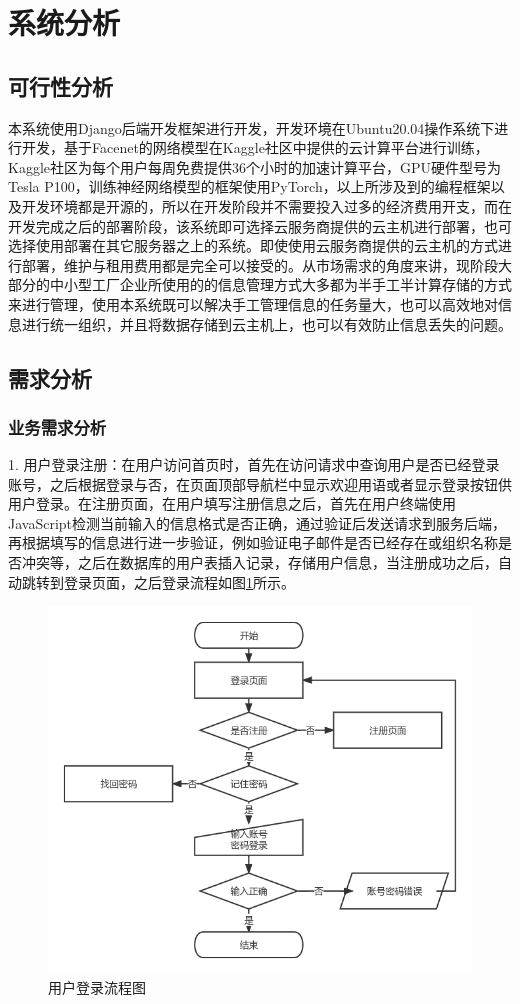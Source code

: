 \section{系统分析}

\subsection{可行性分析}

本系统使用Django后端开发框架进行开发，开发环境在Ubuntu20.04操作系统下进行开发，基于Facenet的网络模型在Kaggle社区中提供的云计算平台进行训练，Kaggle社区为每个用户每周免费提供36个小时的加速计算平台，GPU硬件型号为Tesla P100，训练神经网络模型的框架使用PyTorch，以上所涉及到的编程框架以及开发环境都是开源的，所以在开发阶段并不需要投入过多的经济费用开支，而在开发完成之后的部署阶段，该系统即可选择云服务商提供的云主机进行部署，也可选择使用部署在其它服务器之上的系统。即使使用云服务商提供的云主机的方式进行部署，维护与租用费用都是完全可以接受的。从市场需求的角度来讲，现阶段大部分的中小型工厂企业所使用的的信息管理方式大多都为半手工半计算存储的方式来进行管理，使用本系统既可以解决手工管理信息的任务量大，也可以高效地对信息进行统一组织，并且将数据存储到云主机上，也可以有效防止信息丢失的问题。

\subsection{需求分析}

\subsubsection{业务需求分析}

1. 用户登录注册：在用户访问首页时，首先在访问请求中查询用户是否已经登录账号，之后根据登录与否，在页面顶部导航栏中显示欢迎用语或者显示登录按钮供用户登录。在注册页面，在用户填写注册信息之后，首先在用户终端使用JavaScript检测当前输入的信息格式是否正确，通过验证后发送请求到服务后端，再根据填写的信息进行进一步验证，例如验证电子邮件是否已经存在或组织名称是否冲突等，之后在数据库的用户表插入记录，存储用户信息，当注册成功之后，自动跳转到登录页面，之后登录流程如图\ref{fig:login}所示。

\begin{figure}[H]
    \centering
    \includegraphics[width=.5\textwidth]{figures/3loginprocess.png}
    \caption{用户登录流程图}
    \label{fig:login}
\end{figure}

